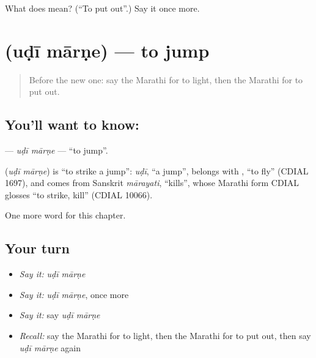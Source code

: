 \begin{tcolorbox}[breakable,colback=teal!4,colframe=teal!35!black,title={Before you move on}]
What does  mean? (\textquotedblleft{}To put out\textquotedblright{}.) Say it once more.
\end{tcolorbox}
\section[\texorpdfstring{\mr{उडी} \mr{मारणे} (uḍī mārṇe)}{उडी मारणे (uḍī mārṇe)}]{  (uḍī mārṇe) — to jump}

\label{lesson:MR-C162-udi-marne}



\begin{quote}
Before the new one: say the Marathi for to light, then the Marathi for to put out.
\end{quote}

\subsection*{You'll want to know:  }
\textbf{ } — \emph{uḍī mārṇe} — \textquotedblleft{}to jump\textquotedblright{}.

\begin{cousinweb}
\textbf{ } (\emph{uḍī mārṇe}) is \textquotedblleft{}to strike a jump\textquotedblright{}: \emph{uḍī}, \textquotedblleft{}a jump\textquotedblright{}, belongs with \textbf{}, \textquotedblleft{}to fly\textquotedblright{} (CDIAL 1697), and \textbf{} comes from Sanskrit \emph{mārayati}, \textquotedblleft{}kills\textquotedblright{}, whose Marathi form CDIAL glosses \textquotedblleft{}to strike, kill\textquotedblright{} (CDIAL 10066).
\end{cousinweb}

\begin{grammarlens}[title={What you've built}]
One more word for this chapter.
\end{grammarlens}

\subsection*{Your turn}
\begin{itemize}
\raggedright
  \item \emph{Say it:} \emph{uḍī mārṇe}
  \item \emph{Say it:} \emph{uḍī mārṇe}, once more
  \item \emph{Say it:} say \emph{uḍī mārṇe}
  \item \emph{Recall:} say the Marathi for to light, then the Marathi for to put out, then say \emph{uḍī mārṇe} again
\end{itemize}

